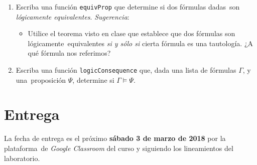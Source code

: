 \documentclass[paper=letter, fontsize=12pt]{scrartcl}
\begin{document}
\begin{enumerate}[resume]
\item Escriba una función \verb+equivProp+ que determine si dos fórmulas dadas\
  son \emph{lógicamente equivalentes}. \emph{Sugerencia}:
  \begin{itemize}
  \item Utilice el teorema visto en clase que establece que dos fórmulas son lógicamente\
    equivalentes \emph{si y sólo si} cierta fórmula es una tautología. ¿A qué fórmula nos referimos?
  \end{itemize}
\item Escriba una función \verb+logicConsequence+ que, dada una lista de fórmulas $\Gamma$, y una\
  proposición $\Psi$, determine si $\Gamma \models \Psi$.
\end{enumerate}

\section{Entrega}

\noindent
La fecha de entrega es el próximo \textbf{sábado 3 de marzo de 2018} por la plataforma\
de \emph{Google Classroom} del curso y siguiendo los lineamientos del laboratorio.
\end{document}
